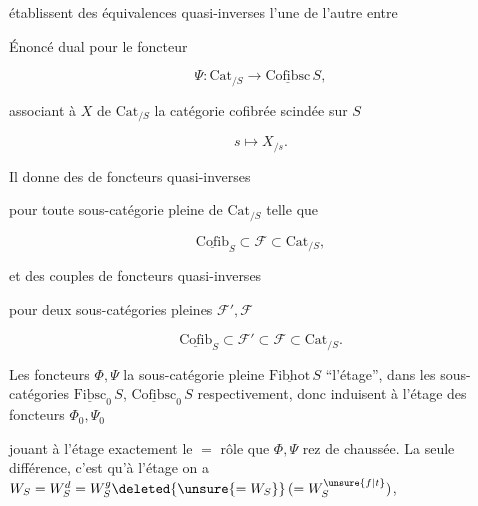 
établissent des équivalences quasi-inverses l'une de l'autre entre


Énoncé dual pour le foncteur

\[
\Psi:\mathrm{Cat}_{/S}\longrightarrow\underline{\mathrm{Cofibsc}}\,S,
\]

associant à $X$ de $\mathrm{Cat}_{/S}$ la catégorie cofibrée scindée sur $S$

\[
s\longmapsto X_{/s}.
\]

Il donne des  de foncteurs quasi-inverses


pour toute sous-catégorie pleine  de $\mathrm{Cat}_{/S}$ telle que

\[
\underline{\mathrm{Cofib}}_S\subset\mathcal{F}\subset\mathrm{Cat}_{/S},
\]

et des couples de foncteurs quasi-inverses


pour deux sous-catégories pleines $\mathcal{F}',\mathcal{F}$

\[
\underline{\mathrm{Cofib}}_S\subset\mathcal{F}'\subset\mathcal{F}\subset\mathrm{Cat}_{/S}.
\]

Les foncteurs $\Phi,\Psi$   la sous-catégorie pleine $\underline{\mathrm{Fibhot}}\,S$  ``l'étage'', dans les sous-catégories $\underline{\mathrm{Fibsc}}_0\,S$, $\underline{\mathrm{Cofibsc}}_0\,S$ respectivement, donc induisent à l'étage des foncteurs $\Phi_0,\Psi_0$


jouant à l'étage exactement le $=$ rôle que $\Phi,\Psi$  rez de chaussée. La seule différence, c'est qu'à l'étage on a $W_S=W_S^d=W_S^g\deleted{\unsure{=W_S}}\,(=W_S^{\unsure{f|t}})$,
